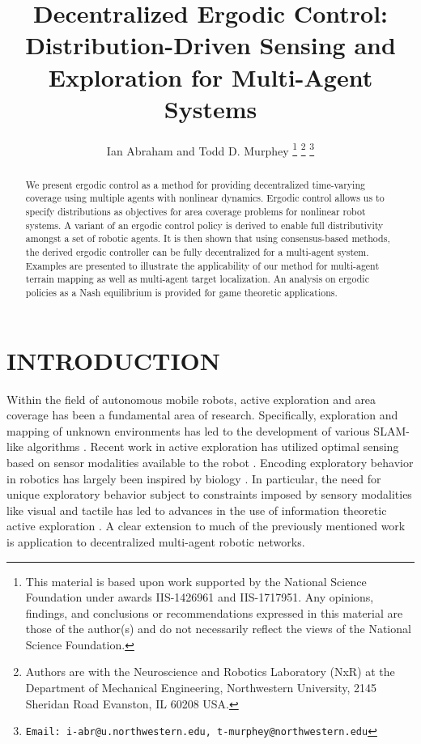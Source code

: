 \documentclass[letterpaper, 10 pt, conference]{ieeeconf}  %
\title{\LARGE \bf
Decentralized Ergodic Control: Distribution-Driven Sensing and Exploration for Multi-Agent Systems
}
\author{Ian Abraham and Todd D. Murphey
\thanks{This material is based upon work supported by the National Science Foundation under awards IIS-1426961 and IIS-1717951. Any opinions, findings, and conclusions or recommendations expressed in this material are those of the author(s) and do not necessarily reflect the views of the National Science Foundation.}%
\thanks{Authors are with the Neuroscience and Robotics Laboratory (NxR) at the Department of Mechanical Engineering, Northwestern University, 2145 Sheridan Road Evanston, IL 60208 USA.}
\thanks{{\tt\small Email: i-abr@u.northwestern.edu, t-murphey@northwestern.edu}}
}
\begin{document}
\maketitle
\thispagestyle{empty}
\pagestyle{empty}


\begin{abstract}
We present ergodic control as a method for providing decentralized time-varying coverage using multiple agents with nonlinear dynamics.
Ergodic control allows us to specify distributions as objectives for area coverage problems for nonlinear robot systems. 
A variant of an ergodic control policy is derived  to enable full distributivity amongst a set of robotic agents.
It is then shown that using consensus-based methods, the derived ergodic controller can be fully decentralized for a multi-agent system.
Examples are presented to illustrate the applicability of our method for multi-agent terrain mapping as well as 
multi-agent target localization.
An analysis on ergodic policies as a Nash equilibrium is provided for game theoretic applications.
\end{abstract}


\section{INTRODUCTION}
\label{sec:introduction}

Within the field of autonomous mobile robots, active exploration and area coverage has been a fundamental area of research. 
Specifically, exploration and mapping of unknown environments has led to the development of various SLAM-like algorithms \cite{bailey2006simultaneous, durrant2006simultaneous, choset2001topological}. 
Recent work in active exploration has utilized optimal sensing based on sensor modalities available to the robot \cite{abraham2017ergodic, de2016ergodic, miller2016ergodic, yang2013human, ts_ref_1}. 
Encoding exploratory behavior in robotics has largely been inspired by biology \cite{iida2016biologically, zhu2015bioinspired}. In particular, the need for unique exploratory behavior subject to constraints imposed by sensory modalities like visual and tactile has led to advances in the use of information theoretic active exploration \cite{mavrommatiTRO2017realTime, abraham2017ergodic, miller2016ergodic, mihaylova2002comparison, ryan2010particle}. 
A clear extension to much of the previously mentioned work is application to decentralized multi-agent robotic networks.
\end{document}
